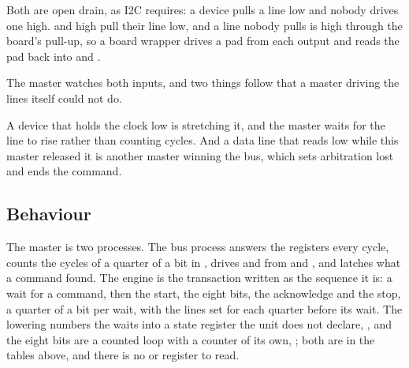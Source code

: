 Both are open drain, as I2C requires: a device pulls a line low and
nobody drives one high.  and  high pull
their line low, and a line nobody pulls is high through the board's
pull-up, so a board wrapper drives a pad from each output and reads
the pad back into  and .

The master watches both inputs, and two things follow that a master
driving the lines itself could not do.

A device that holds the clock low is stretching it, and the master
waits for the line to rise rather than counting cycles. And a data
line that reads low while this master released it is another master
winning the bus, which sets arbitration lost and ends the command.

\subsection*{Behaviour}

The master is two processes. The bus process answers the registers
every cycle, counts the cycles of a quarter of a bit in ,
drives  and  from  and
, and latches what a command found. The engine is the
transaction written as the sequence it is: a wait for a command, then
the start, the eight bits, the acknowledge and the stop, a quarter of
a bit per wait, with the lines set for each quarter before its wait.
The lowering numbers the waits into a state register the unit does not
declare, , and the eight bits are a counted loop with a
counter of its own, ; both are in the tables above, and
there is no  or  register to read.

